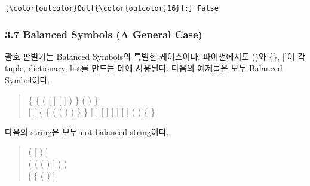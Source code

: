 \documentclass[11pt]{article}
\begin{document}
\begin{Verbatim}[commandchars=\\\{\}]
{\color{outcolor}Out[{\color{outcolor}16}]:} False
\end{Verbatim}
            
    \subsubsection{3.7 Balanced Symbols (A General
Case)}\label{balanced-symbols-a-general-case}

    괄호 판별기는 Balanced Symbols의 특별한 케이스이다. 파이썬에서도 ()와
\{\}, {[}{]}이 각 tuple, dictionary, list를 만드는 데에 사용된다. 다음의
예제들은 모두 Balanced Symbol이다.

    \begin{quote}
\{ \{ ( {[} {]} {[} {]} ) \} ( ) \}\\
{[} {[} \{ \{ ( ( ) ) \} \} {]} {]} {[} {]} {[} {]} {[} {]} ( ) \{ \}
\end{quote}

    다음의 string은 모두 not balanced string이다.

    \begin{quote}
( {[} ) {]}\\
( ( ( ) {]} ) )\\
{[} \{ ( ) {]}
\end{quote}
\end{document}
